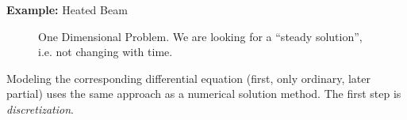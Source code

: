 \documentclass[a4paper,12pt]{report}
\begin{document}
	\begin{center}
	\begin{figure}[!htb]
	\end{figure}
	\end{center}
	
	\pagebreak
	\noindent \textbf{Example:} Heated Beam
	\begin{center}
	\begin{figure}[!htb]

	\caption{One Dimensional Problem. We are looking for a ``steady solution'', i.e. not changing with time.}\label{fig:Heated Beam}
	\end{figure}
	\end{center}
	
	Modeling the corresponding differential equation (first, only ordinary, later partial) uses the same approach as a numerical solution method.
	The first step is \textit{discretization}.
	
\end{document}
